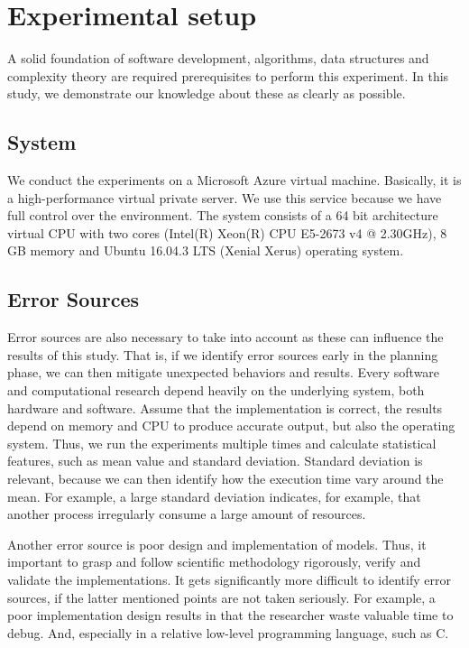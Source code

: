 \documentclass[a4paper,11pt]{kth-mag}
\newcommand*{\skippara}{\par\vspace{\baselineskip} \noindent}
\begin{document}
\section{Experimental setup}\label{sec:setup}
A solid foundation of software development, algorithms, data structures and complexity theory are required prerequisites to perform this experiment.
In this study, we demonstrate our knowledge about these as clearly as possible.

\subsection{System}
We conduct the experiments on a Microsoft Azure virtual machine.
Basically, it is a high-performance virtual private server.
We use this service because we have full control over the environment.
The system consists of a 64 bit architecture virtual CPU with two cores (Intel(R) Xeon(R) CPU E5-2673 v4 @ 2.30GHz), 8 GB memory and Ubuntu 16.04.3 LTS (Xenial Xerus) operating system.

\subsection{Error Sources} Error sources are also necessary to take into account as these can influence the results of this study.
That is, if we identify error sources early in the planning phase, we can then mitigate unexpected behaviors and results.
Every software and computational research depend heavily on the underlying system, both hardware and software.
Assume that the implementation is correct, the results depend on memory and CPU to produce accurate output, but also the operating system.
Thus, we run the experiments multiple times and calculate statistical features, such as mean value and standard deviation.
Standard deviation is relevant, because we can then identify how the execution time vary around the mean.
For example, a large standard deviation indicates, for example, that another process irregularly consume a large amount of resources.

\skippara Another error source is poor design and implementation of models.
Thus, it important to grasp and follow scientific methodology rigorously, verify and validate the implementations.
It gets significantly more difficult to identify error sources, if the latter mentioned points are not taken seriously.
For example, a poor implementation design results in that the researcher waste valuable time to debug.
And, especially in a relative low-level programming language, such as C.
\end{document}

